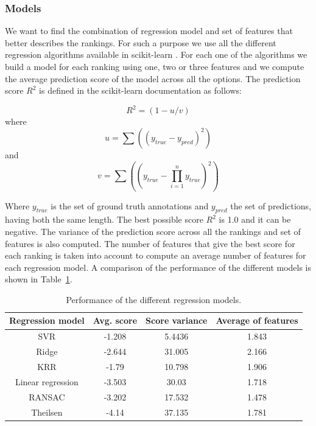 \documentclass{article}
\begin{document}
\subsubsection{Models}
We want to find the combination of regression model and set of features that better describes the rankings. For such a purpose we use all the different regression algorithms available in scikit-learn \cite{08}.  For each one of the algorithms we build a model for each ranking using one, two or three features and we compute the average prediction score of the model across all the options. The prediction score $R^2$ is defined in the scikit-learn documentation as follows:

\begin{equation}
 R^2 = (1 - u/v) 
\end{equation}
where
\begin{equation}
	u = \sum\nolimits((y_{true} - y_{pred})^2)
\end{equation}
and
\begin{equation}
	v = \sum\nolimits((y_{true} - \prod\limits_{i=1}^n y_{true})^2)
\end{equation}

Where $y_{true}$ is the set of ground truth annotations and $y_{pred}$ the set of predictions, having both the same length. The best possible score $R^2$ is 1.0 and it can be negative.
The variance of the prediction score across all the rankings and set of features is also computed. 
The number of features that give the best score for each ranking is taken into account to compute an average number of features for each regression model. A comparison of the performance of the different models is shown in Table~\ref{models}.

\begin{table}[]
\centering
\label{my-label}
\begin{tabular}{cccc}
\hline
Regression model  & Avg. score & Score variance & Average of features \\ \hline
SVR               & -1.208     & 5.4436         & 1.843               \\
Ridge             & -2.644     & 31.005         & 2.166               \\
KRR               & -1.79      & 10.798         & 1.906               \\
Linear regression & -3.503     & 30.03          & 1.718               \\
RANSAC            & -3.202     & 17.532         & 1.478               \\
Theilsen          & -4.14      & 37.135         & 1.781               \\ \hline
\end{tabular}
\caption{Performance of the different regression models.}
\label{models}
\end{table}
\end{document}

